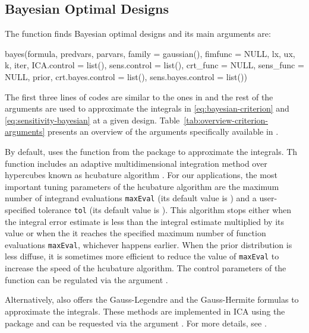 \subsection{Bayesian Optimal Designs}\label{sec:Bayesian}
The   function finds Bayesian optimal designs and its main  arguments are:
  \begin{example}
bayes(formula, predvars, parvars, family = gaussian(), fimfunc = NULL,
      lx, ux, k, iter, ICA.control = list(), sens.control = list(),
      crt_func = NULL, sens_func = NULL,
      prior, crt.bayes.control = list(), sens.bayes.control = list())
\end{example}
The first three lines of codes are similar to the ones in  and the rest of the arguments are used  to approximate the integrals in \eqref{eq:bayesian-criterion} and \eqref{eq:sensitivity-bayesian} at a given design.
Table~\ref{tab:overview-criterion-arguments} presents an overview of the  arguments specifically available in .


By default,   uses the  function
from the  package \citep{johnson-cubature, cubature} to approximate the integrals.
Th function   includes an adaptive  multidimensional integration method over hypercubes known as  hcubature algorithm \citep{berntsen1991, genz1980}. For our applications, the most important tuning parameters of  the hcubature algorithm are the maximum number of  integrand evaluations \texttt{maxEval} (its default value is  ) and  a user-specified tolerance  \texttt{tol} (its default value is ). This algorithm stops either when the integral  error estimate is less than the  integral estimate multiplied by its value or when the  it reaches the  specified maximum number of function evaluations \texttt{maxEval}, whichever happens earlier. When the prior distribution is less diffuse, it is sometimes more efficient to reduce  the value of   \texttt{maxEval} to increase the speed of the hcubature  algorithm. The control parameters of the  function can be regulated via the argument .

Alternatively,    also offers  the  Gauss-Legendre  and  the Gauss-Hermite formulas to approximate the integrals.
These methods are implemented in ICA using the   package \citep{mvQuad} and can be requested via the argument . For more details, see .

